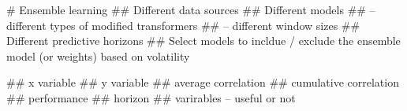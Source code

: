 # Ensemble learning
## Different data sources
## Different models
##   -- different types of modified transformers
##   -- different window sizes
## Different predictive horizons
## Select models to incldue / exclude the ensemble model (or weights) based on volatility


## x variable
## y variable
## average correlation
## cumulative correlation
## performance
## horizon
## varirables -- useful or not
